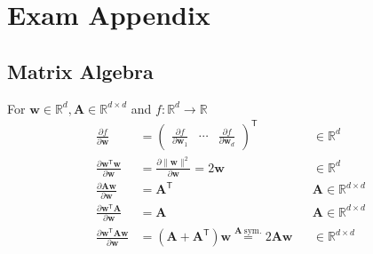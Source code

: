 \section{Exam Appendix}
\subsection{Matrix Algebra}
For $\mathbf{w}\in \mathbb{R}^d, \mathbf{A}\in \mathbb{R}^{d\times d}$ and $ f: \mathbb{R}^d\to \mathbb{R}$
\noindent\begin{align*}
    \frac{\partial f}{\partial \mathbf{w}}                                                                                             & =
    \begin{pmatrix}\frac{\partial f}{\partial \mathbf{w}_1} & \cdots & \frac{\partial f}{\partial \mathbf{w}_d}
    \end{pmatrix}^{\mathsf{T}} &                                                                                                                 & \in \mathbb{R}^d                                                                                                                                                \\[1em]
    \frac{\partial \mathbf{w}^{\mathsf{T}}\mathbf{w}}{\partial \mathbf{w}}                                                             & =\frac{\partial\|\mathbf{w}\|^2}{\partial \mathbf{w}}=2\mathbf{w}                                               &                  & \in \mathbb{R}^d                     \\
    \frac{\partial \mathbf{A}\mathbf{w}}{\partial \mathbf{w}}                                                                          & ={\mathbf{A}}^{\mathsf{T}}                                                                                      &                  & \mathbf{A}\in \mathbb{R}^{d\times d} \\
    \frac{\partial \mathbf{w}^{\mathsf{T}}\mathbf{A}}{\partial \mathbf{w}}                                                             & = \mathbf{A}                                                                                                    &                  & \mathbf{A}\in \mathbb{R}^{d\times d} \\
    \frac{\partial \mathbf{w}^{\mathsf{T}}\mathbf{Aw}}{\partial \mathbf{w}}                                                            & = \left(\mathbf{A}+\mathbf{A}^{\mathsf{T}}\right)\mathbf{w} \overset{\mathbf{A}\ \mathrm{sym.}}{=} 2\mathbf{Aw} &                  & \in \mathbb{R}^{d\times d}
\end{align*}